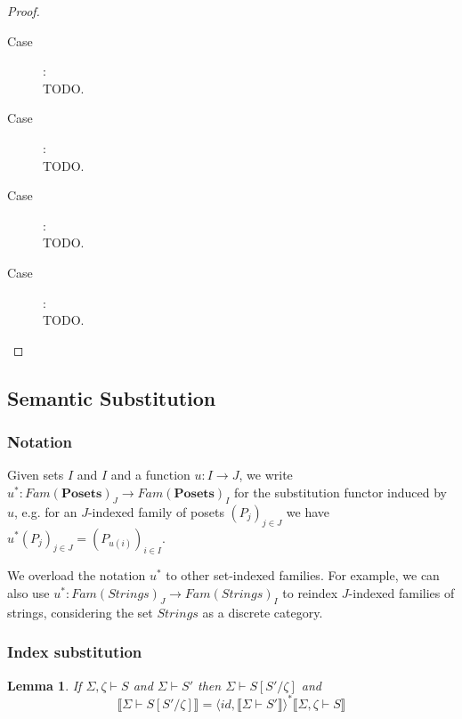 \documentclass{article}
\newtheorem{lemma}{Lemma}
\newcommand{\mbf}{\mathbf}
\newcommand{\sem}[1]{\llbracket #1 \rrbracket}
\newcommand{\sdisp}[1]{
\left( #1 \right)
}
\begin{document}
\begin{proof}
\begin{description}
\item[Case \begin{sc}StrAbs\end{sc}]:~\\

TODO.

\item[Case ]:~\\

TODO.

\item[Case ]:~\\

TODO.

\item[Case ]:~\\

TODO.

\end{description}

\end{proof}

\subsection*{Semantic Substitution}

\subsubsection*{Notation}

Given sets $I$ and $I$ and a function $u : I \to J$, we write $u^* : \mathit{Fam}(\mbf{Posets})_J \to \mathit{Fam}(\mbf{Posets})_I$ for the substitution functor induced by $u$, e.g. for an $J$-indexed family of posets $\sdisp{P_j}_{j \in J}$ we have $u^* \sdisp{P_j}_{j \in J} = \sdisp{ P_{u(i)} }_{i \in I}$.

We overload the notation $u^*$ to other set-indexed families. For example, we can also use $u^* : \mathit{Fam}(\mathit{Strings})_J \to \mathit{Fam}(\mathit{Strings})_I$ to reindex $J$-indexed families of strings, considering the set $\mathit{Strings}$ as a discrete category. 

\subsubsection*{Index substitution}

\begin{lemma}
If $\Sigma,\zeta \vdash S$ and $\Sigma \vdash S'$ then $\Sigma \vdash S[S'/\zeta]$ and $$\sem{\Sigma \vdash S[S'/\zeta]} = \langle \mathit{id}, \sem{\Sigma \vdash S'} \rangle^* \sem{\Sigma,\zeta \vdash S}$$
\end{lemma}
\end{document}
